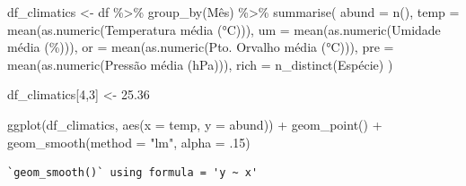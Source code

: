 \documentclass[
  letterpaper,
  DIV=11,
  numbers=noendperiod]{scrartcl}
\newenvironment{Shaded}{\begin{snugshade}}{\end{snugshade}}
\newcommand{\AttributeTok}[1]{\textcolor[rgb]{0.40,0.45,0.13}{#1}}
\newcommand{\DecValTok}[1]{\textcolor[rgb]{0.68,0.00,0.00}{#1}}
\newcommand{\FloatTok}[1]{\textcolor[rgb]{0.68,0.00,0.00}{#1}}
\newcommand{\FunctionTok}[1]{\textcolor[rgb]{0.28,0.35,0.67}{#1}}
\newcommand{\NormalTok}[1]{\textcolor[rgb]{0.00,0.23,0.31}{#1}}
\newcommand{\OtherTok}[1]{\textcolor[rgb]{0.00,0.23,0.31}{#1}}
\newcommand{\SpecialCharTok}[1]{\textcolor[rgb]{0.37,0.37,0.37}{#1}}
\newcommand{\StringTok}[1]{\textcolor[rgb]{0.13,0.47,0.30}{#1}}
\begin{document}
\begin{Shaded}
\begin{Highlighting}[]
\NormalTok{df\_climatics }\OtherTok{\textless{}{-}} 
\NormalTok{  df }\SpecialCharTok{\%\textgreater{}\%} 
  \FunctionTok{group\_by}\NormalTok{(Mês) }\SpecialCharTok{\%\textgreater{}\%}
  \FunctionTok{summarise}\NormalTok{(}
    \AttributeTok{abund =} \FunctionTok{n}\NormalTok{(),}
    \AttributeTok{temp =} \FunctionTok{mean}\NormalTok{(}\FunctionTok{as.numeric}\NormalTok{(}\StringTok{\textasciigrave{}}\AttributeTok{Temperatura média (°C)}\StringTok{\textasciigrave{}}\NormalTok{)),}
    \AttributeTok{um =} \FunctionTok{mean}\NormalTok{(}\FunctionTok{as.numeric}\NormalTok{(}\StringTok{\textasciigrave{}}\AttributeTok{Umidade média (\%)}\StringTok{\textasciigrave{}}\NormalTok{)),}
    \AttributeTok{or =} \FunctionTok{mean}\NormalTok{(}\FunctionTok{as.numeric}\NormalTok{(}\StringTok{\textasciigrave{}}\AttributeTok{Pto. Orvalho média (°C)}\StringTok{\textasciigrave{}}\NormalTok{)),}
    \AttributeTok{pre =} \FunctionTok{mean}\NormalTok{(}\FunctionTok{as.numeric}\NormalTok{(}\StringTok{\textasciigrave{}}\AttributeTok{Pressão média (hPa)}\StringTok{\textasciigrave{}}\NormalTok{)),}
    \AttributeTok{rich =} \FunctionTok{n\_distinct}\NormalTok{(}\StringTok{\textasciigrave{}}\AttributeTok{Espécie}\StringTok{\textasciigrave{}}\NormalTok{)}
\NormalTok{  )}

\NormalTok{df\_climatics[}\DecValTok{4}\NormalTok{,}\DecValTok{3}\NormalTok{] }\OtherTok{\textless{}{-}} \FloatTok{25.36}
\end{Highlighting}
\end{Shaded}

\begin{Shaded}
\begin{Highlighting}[]
\FunctionTok{ggplot}\NormalTok{(df\_climatics, }\FunctionTok{aes}\NormalTok{(}\AttributeTok{x =}\NormalTok{ temp, }\AttributeTok{y =}\NormalTok{ abund)) }\SpecialCharTok{+}
  \FunctionTok{geom\_point}\NormalTok{() }\SpecialCharTok{+}
  \FunctionTok{geom\_smooth}\NormalTok{(}\AttributeTok{method =} \StringTok{"lm"}\NormalTok{, }\AttributeTok{alpha =}\NormalTok{ .}\DecValTok{15}\NormalTok{)}
\end{Highlighting}
\end{Shaded}

\begin{verbatim}
`geom_smooth()` using formula = 'y ~ x'
\end{verbatim}
\end{document}
